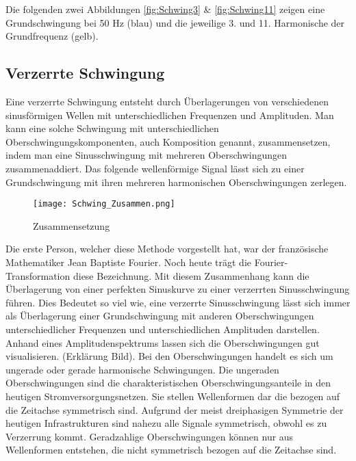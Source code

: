 Die folgenden zwei Abbildungen \ref{fig:Schwing3} \& \ref{fig:Schwing11} zeigen eine Grundschwingung bei 50 Hz (blau) und die jeweilige 3. und 11. Harmonische der Grundfrequenz (gelb).

\subsection{Verzerrte Schwingung}
Eine verzerrte Schwingung entsteht durch Überlagerungen von verschiedenen sinusförmigen Wellen mit unterschiedlichen Frequenzen und Amplituden. Man kann eine solche Schwingung mit unterschiedlichen Oberschwingungskomponenten, auch Komposition genannt, zusammensetzen, indem man eine Sinusschwingung mit mehreren Oberschwingungen zusammenaddiert. Das folgende wellenförmige Signal lässt sich zu einer Grundschwingung mit ihren mehreren harmonischen Oberschwingungen zerlegen. 

\begin{figure}[ht!]
	\centering
	\texttt{[image: Schwing\_Zusammen.png]}	
	\caption{Zusammensetzung \cite{Oberwellen}}\label{fig:Schwing_Zusammen}
\end{figure}

Die erste Person, welcher diese Methode vorgestellt hat, war der französische Mathematiker Jean Baptiste Fourier. Noch heute trägt die Fourier-Transformation diese Bezeichnung. Mit diesem Zusammenhang kann die Überlagerung von einer perfekten Sinuskurve zu einer verzerrten Sinusschwingung führen. Dies Bedeutet so viel wie, eine verzerrte Sinusschwingung lässt sich immer als Überlagerung einer Grundschwingung mit anderen Oberschwingungen unterschiedlicher Frequenzen und unterschiedlichen Amplituden darstellen. Anhand eines Amplitudenspektrums lassen sich die Oberschwingungen gut visualisieren. (Erklärung Bild).
Bei den Oberschwingungen handelt es sich um ungerade oder gerade harmonische Schwingungen.
Die ungeraden Oberschwingungen sind die charakteristischen Oberschwingungsanteile in den heutigen Stromversorgungsnetzen. Sie stellen Wellenformen dar die bezogen auf die Zeitachse symmetrisch sind. Aufgrund der meist dreiphasigen Symmetrie der heutigen Infrastrukturen sind nahezu alle Signale symmetrisch, obwohl es zu Verzerrung kommt. Geradzahlige Oberschwingungen können nur aus Wellenformen entstehen, die nicht symmetrisch bezogen auf die Zeitachse sind.

